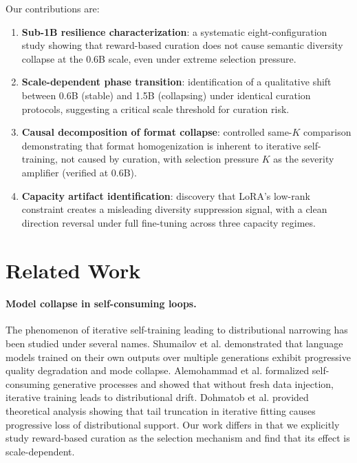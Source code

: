 \documentclass[11pt,a4paper]{article}
\begin{document}
Our contributions are:
\begin{enumerate}
    \item \textbf{Sub-1B resilience characterization}: a systematic eight-configuration study showing that reward-based curation does not cause semantic diversity collapse at the 0.6B scale, even under extreme selection pressure.
    \item \textbf{Scale-dependent phase transition}: identification of a qualitative shift between 0.6B (stable) and 1.5B (collapsing) under identical curation protocols, suggesting a critical scale threshold for curation risk.
    \item \textbf{Causal decomposition of format collapse}: controlled same-$K$ comparison demonstrating that format homogenization is inherent to iterative self-training, not caused by curation, with selection pressure $K$ as the severity amplifier (verified at 0.6B).
    \item \textbf{Capacity artifact identification}: discovery that LoRA's low-rank constraint creates a misleading diversity suppression signal, with a clean direction reversal under full fine-tuning across three capacity regimes.
\end{enumerate}

\section{Related Work}

\paragraph{Model collapse in self-consuming loops.}
The phenomenon of iterative self-training leading to distributional narrowing has been studied under several names. Shumailov et al. demonstrated that language models trained on their own outputs over multiple generations exhibit progressive quality degradation and mode collapse. Alemohammad et al. formalized self-consuming generative processes and showed that without fresh data injection, iterative training leads to distributional drift. Dohmatob et al. provided theoretical analysis showing that tail truncation in iterative fitting causes progressive loss of distributional support. Our work differs in that we explicitly study reward-based curation as the selection mechanism and find that its effect is scale-dependent.
\end{document}
